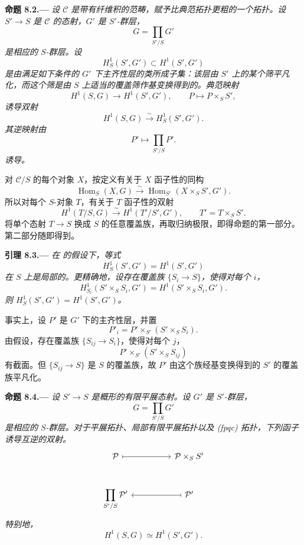 \par\medskip\noindent{}\textbf{命题 8.2.---}\enspace
\emph{设 \(\mathcal C\) 是带有纤维积的范畴，赋予比典范拓扑更粗的一个拓扑。设 \(S'\to S\) 是 \(\mathcal C\) 的态射，\(G'\) 是 \(S'\)-群层，
\[
  G=\prod_{S'/S}G'
\]
是相应的 \(S\)-群层。设
\[
  H^1_S(S',G')\subset H^1(S',G')
\]
是由满足如下条件的 \(G'\) 下主齐性层的类所成子集：该层由 \(S'\) 上的某个筛平凡化，而这个筛是由 \(S\) 上适当的覆盖筛作基变换得到的。典范映射
\[
  H^1(S,G)\longrightarrow H^1(S',G'),
  \qquad
  P\longmapsto P\times_SS',
\]
诱导双射
\[
  H^1(S,G)\xrightarrow{\sim}H^1_S(S',G').
\]
其逆映射由
\[
  P'\longmapsto\prod_{S'/S}P'.
\]
诱导。}

对 \(\mathcal C/S\) 的每个对象 \(X\)，按定义有关于 \(X\) 函子性的同构
\[
  \operatorname{Hom}_S(X,G)
  \xrightarrow{\sim}
  \operatorname{Hom}_{S'}(X\times_SS',G').
\]
所以对每个 \(S\)-对象 \(T\)，有关于 \(T\) 函子性的双射
\[
  H^1(T/S,G)
  \xrightarrow{\sim}
  H^1(T'/S',G'),
  \qquad
  T'=T\times_SS'.
\]
将单个态射 \(T\to S\) 换成 \(S\) 的任意覆盖族，再取归纳极限，即得命题的第一部分。第二部分随即得到。

\par\medskip\noindent{}\textbf{引理 8.3.---}\enspace
\emph{在  的假设下，等式
\[
  H^1_S(S',G')=H^1(S',G')
\]
在 \(S\) 上是局部的。更精确地，设存在覆盖族 \(\{S_i\to S\}\)，使得对每个 \(i\)，
\[
  H^1_{S_i}(S'\times_SS_i,G')
  =
  H^1(S'\times_SS_i,G').
\]
则 \(H^1_S(S',G')=H^1(S',G')\)。}

事实上，设 \(P'\) 是 \(G'\) 下的主齐性层，并置
\[
  P'_i=P'\times_{S'}(S'\times_SS_i).
\]
由假设，存在覆盖族 \(\{S_{ij}\to S_i\}\)，使得对每个 \(j\)，
\[
  P'\times_{S'}(S'\times_SS_{ij})
\]
有截面。但 \(\{S_{ij}\to S\}\) 是 \(S\) 的覆盖族，故 \(P'\) 由这个族经基变换得到的 \(S'\) 的覆盖族平凡化。

\par\medskip\noindent{}\textbf{命题 8.4.---}\enspace
\emph{设 \(S'\to S\) 是概形的有限平展态射。设 \(G'\) 是 \(S'\)-群层，
\[
  G=\prod_{S'/S}G'
\]
是相应的 \(S\)-群层。对于平展拓扑、局部有限平展拓扑以及 \textup{(fpqc)} 拓扑，下列函子诱导互逆的双射。}
\[
\begin{tikzcd}[column sep=huge,row sep=large]
\mathcal P
  \arrow[r,mapsto]
&
\mathcal P\times_S S'
\\
\displaystyle\prod_{S'/S}\mathcal P'
&
\mathcal P'
  \arrow[l,mapsto]
\end{tikzcd}
\]
\emph{特别地，
\[
  H^1(S,G)\simeq H^1(S',G').
\]}

